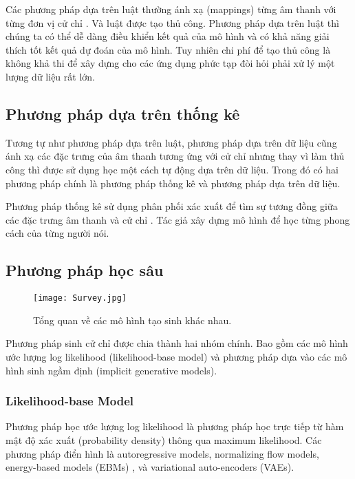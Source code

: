 Các phương pháp dựa trên luật thường ánh xạ (mappings) từng âm thanh với từng đơn vị cử chỉ \cite{huang2012robot}. Và luật được tạo thủ công. Phương pháp dựa trên luật thì chúng ta có thể dễ dàng điều khiển kết quả của mô hình và có khả năng giải thích tốt kết quả dự đoán của mô hình.
Tuy nhiên chi phí để tạo thủ công là không khả thi để xây dựng cho các ứng dụng phức tạp đòi hỏi phải xử lý một lượng dữ liệu rất lớn.

\subsection{Phương pháp dựa trên thống kê}

Tương tự như phương pháp dựa trên luật, phương pháp dựa trên dữ liệu cũng ánh xạ các đặc trưng của âm thanh tương ứng với cử chỉ nhưng thay vì làm thủ công thì được sử dụng học một cách tự động dựa trên dữ liệu.
Trong đó có hai phương pháp chính là phương pháp thống kê và phương pháp dựa trên dữ liệu.


Phương pháp thống kê sử dụng phân phối xác xuất để tìm sự tương đồng giữa các đặc trưng âm thanh và cử chỉ \cite{levine2010gesture}. Tác giả \cite{neff2008gesture} xây dựng mô hình để học từng phong cách của từng người nói.

\subsection{Phương pháp học sâu}

\setcounter{figure}{3}
\begin{figure}
	\centering
	\texttt{[image: Survey.jpg]}
	\caption{Tổng quan về các mô hình tạo sinh khác nhau.}
	\label{fig:generative-models}
\end{figure}

Phương pháp sinh cử chỉ được chia thành hai nhóm chính. Bao gồm các mô hình ước lượng log likelihood (likelihood-base model)  và phương pháp dựa vào các mô hình sinh ngầm định (implicit generative models).

\subsubsection{Likelihood-base Model}

Phương pháp học ước lượng log likelihood là phương pháp học trực tiếp từ hàm mật độ xác xuất (probability density) thông qua maximum likelihood. Các phương pháp điển hình là autoregressive models, normalizing flow models, energy-based models (EBMs)
, và variational auto-encoders (VAEs).

